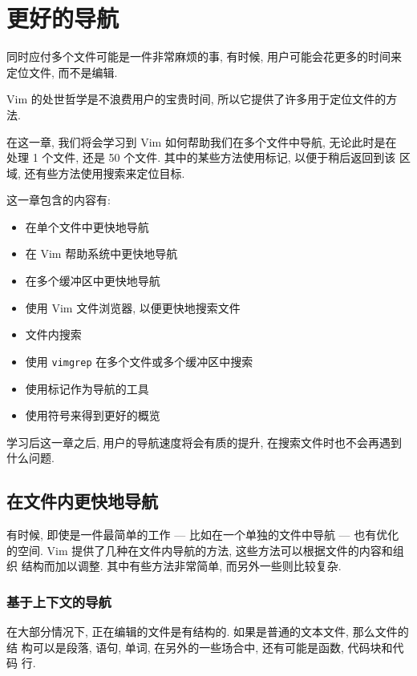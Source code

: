 \chapter{更好的导航}
\label{chap:better_navigation}
同时应付多个文件可能是一件非常麻烦的事, 有时候, 用户可能会花更多的时间来
定位文件, 而不是编辑.

Vim 的处世哲学是不浪费用户的宝贵时间, 所以它提供了许多用于定位文件的方法.

在这一章, 我们将会学习到 Vim 如何帮助我们在多个文件中导航, 无论此时是在
处理 1 个文件, 还是 50 个文件. 其中的某些方法使用标记, 以便于稍后返回到该
区域, 还有些方法使用搜索来定位目标.

这一章包含的内容有:
\begin{itemize}
    \item 在单个文件中更快地导航
    \item 在 Vim 帮助系统中更快地导航
    \item 在多个缓冲区中更快地导航
    \item 使用 Vim 文件浏览器, 以便更快地搜索文件
    \item 文件内搜索
    \item 使用 \texttt{vimgrep} 在多个文件或多个缓冲区中搜索
    \item 使用标记作为导航的工具
    \item 使用符号来得到更好的概览
\end{itemize}

学习后这一章之后, 用户的导航速度将会有质的提升, 在搜索文件时也不会再遇到
什么问题.
\section{在文件内更快地导航}
\label{sec:faster_navigation_in_a_file}

有时候, 即使是一件最简单的工作 --- 比如在一个单独的文件中导航 --- 也有优化
的空间. Vim 提供了几种在文件内导航的方法, 这些方法可以根据文件的内容和组织
结构而加以调整. 其中有些方法非常简单, 而另外一些则比较复杂.

\subsection{基于上下文的导航}
\label{subsec:context_aware_navigation}

在大部分情况下, 正在编辑的文件是有结构的. 如果是普通的文本文件, 那么文件的结
构可以是段落, 语句, 单词, 在另外的一些场合中, 还有可能是函数, 代码块和代码
行.

